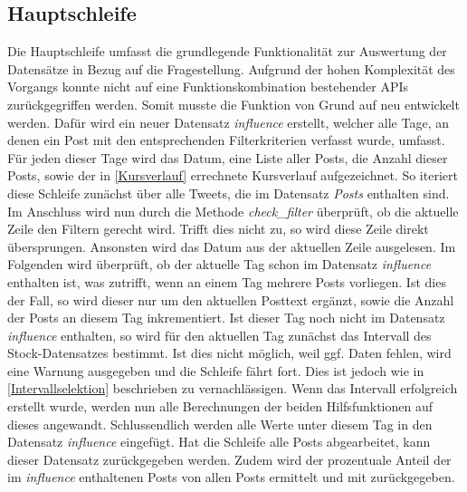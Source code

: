\documentclass{article}
\begin{document}
\subsection{Hauptschleife} \label{Hauptschleife}
Die Hauptschleife umfasst die grundlegende Funktionalität zur Auswertung der Datensätze in Bezug auf die Fragestellung.
Aufgrund der hohen Komplexität des Vorgangs konnte nicht auf eine Funktionskombination bestehender APIs zurückgegriffen werden.
Somit musste die Funktion von Grund auf neu entwickelt werden.
Dafür wird ein neuer Datensatz \textit{influence} erstellt, welcher alle Tage, an denen ein Post mit den entsprechenden Filterkriterien verfasst wurde, umfasst.
Für jeden dieser Tage wird das Datum, eine Liste aller Posts, die Anzahl dieser Posts, sowie der in \ref{Kursverlauf} errechnete Kursverlauf aufgezeichnet.
So iteriert diese Schleife zunächst über alle Tweets, die im Datensatz \textit{Posts} enthalten sind.
Im Anschluss wird nun durch die Methode \textit{check\_filter} überprüft, ob die aktuelle Zeile den Filtern gerecht wird.
Trifft dies nicht zu, so wird diese Zeile direkt übersprungen.
Ansonsten wird das Datum aus der aktuellen Zeile ausgelesen.
Im Folgenden wird überprüft, ob der aktuelle Tag schon im Datensatz \textit{influence} enthalten ist, was zutrifft, wenn an einem Tag mehrere Posts vorliegen.
Ist dies der Fall, so wird dieser nur um den aktuellen Posttext ergänzt, sowie die Anzahl der Posts an diesem Tag inkrementiert.
Ist dieser Tag noch nicht im Datensatz \textit{influence} enthalten, so wird für den aktuellen Tag zunächst das Intervall des Stock-Datensatzes bestimmt.
Ist dies nicht möglich, weil ggf. Daten fehlen, wird eine Warnung ausgegeben und die Schleife fährt fort.
Dies ist jedoch wie in \ref{Intervallselektion} beschrieben zu vernachlässigen.
Wenn das Intervall erfolgreich erstellt wurde, werden nun alle Berechnungen der beiden Hilfsfunktionen auf dieses angewandt.
Schlussendlich werden alle Werte unter diesem Tag in den Datensatz \textit{influence} eingefügt.
Hat die Schleife alle Posts abgearbeitet, kann dieser Datensatz zurückgegeben werden.
Zudem wird der prozentuale Anteil der im \textit{influence} enthaltenen Posts von allen Posts ermittelt und mit zurückgegeben.
\end{document}
